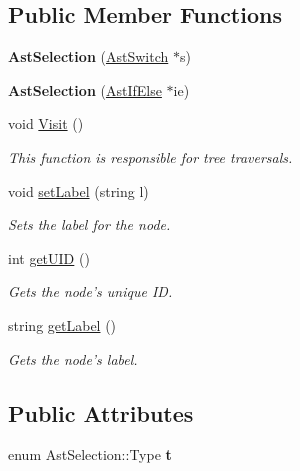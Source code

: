 \subsection*{Public Member Functions}
\begin{DoxyCompactItemize}
\item 
\hypertarget{classAstSelection_afac2e382bc352b49ca61e6017eb58130}{{\bfseries Ast\-Selection} (\hyperlink{classAstSwitch}{Ast\-Switch} $\ast$s)}\label{classAstSelection_afac2e382bc352b49ca61e6017eb58130}

\item 
\hypertarget{classAstSelection_aaed7d12c4b620b13f70e2d19e15eff0c}{{\bfseries Ast\-Selection} (\hyperlink{classAstIfElse}{Ast\-If\-Else} $\ast$ie)}\label{classAstSelection_aaed7d12c4b620b13f70e2d19e15eff0c}

\item 
void \hyperlink{classAstSelection_a811114a424918b2141b5eb0e341c3a22}{Visit} ()
\begin{DoxyCompactList}\small\item\em This function is responsible for tree traversals. \end{DoxyCompactList}\item 
void \hyperlink{classAST_a71d680856e95ff89f55d5311a552eba6}{set\-Label} (string l)
\begin{DoxyCompactList}\small\item\em Sets the label for the node. \end{DoxyCompactList}\item 
int \hyperlink{classAST_ab7a5b1d9f1c2de0d98deb356f724a42c}{get\-U\-I\-D} ()
\begin{DoxyCompactList}\small\item\em Gets the node's unique I\-D. \end{DoxyCompactList}\item 
string \hyperlink{classAST_aee029be902fffc927d16ccb03eb922ad}{get\-Label} ()
\begin{DoxyCompactList}\small\item\em Gets the node's label. \end{DoxyCompactList}\end{DoxyCompactItemize}
\subsection*{Public Attributes}
\begin{DoxyCompactItemize}
\item 
\hypertarget{classAstSelection_aea6ccdf9cb0336c1302cbac08e55ae8a}{enum Ast\-Selection\-::\-Type {\bfseries t}}\label{classAstSelection_aea6ccdf9cb0336c1302cbac08e55ae8a}

\end{DoxyCompactItemize}
